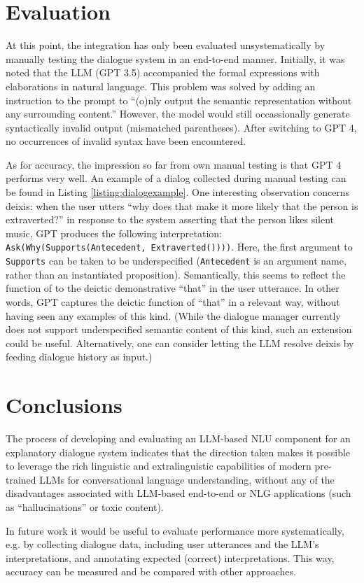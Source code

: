 \documentclass[11pt]{article}
\begin{document}
\section{Evaluation}
\label{sec:evaluation}
At this point, the integration has only been evaluated unsystematically by manually testing the dialogue system in an end-to-end manner. Initially, it was noted that the LLM (GPT 3.5) accompanied the formal expressions with elaborations in natural language. This problem was solved by adding an instruction to the prompt to ``(o)nly output the semantic representation without any surrounding content.'' However, the model would still occassionally generate syntactically invalid output (mismatched parentheses). After switching to GPT 4, no occurrences of invalid syntax have been encountered.

As for accuracy, the impression so far from own manual testing is that GPT 4 performs very well. An example of a dialog collected during manual testing can be found in Listing \ref{listing:dialogexample}. One interesting observation concerns deixis: when the user utters ``why does that make it more likely that the person is extraverted?'' in response to the system asserting that the person likes silent music, GPT produces the following interpretation: \texttt{Ask(Why(Supports(Antecedent, Extraverted())))}. Here, the first argument to \texttt{Supports} can be taken to be underspecified (\texttt{Antecedent} is an argument name, rather than an instantiated proposition). Semantically, this seems to reflect the function of to the deictic demonstrative ``that'' in the user utterance. In other words, GPT captures the deictic function of ``that'' in a relevant way, without having seen any examples of this kind. (While the dialogue manager currently does not support underspecified semantic content of this kind, such an extension could be useful. Alternatively, one can consider letting the LLM resolve deixis by feeding dialogue history as input.)



\section{Conclusions}
The process of developing and evaluating an LLM-based NLU component for an explanatory dialogue system indicates that the direction taken makes it possible to leverage the rich linguistic and extralinguistic capabilities of modern pre-trained LLMs for conversational language understanding, without any of the disadvantages associated with LLM-based end-to-end or NLG applications (such as ``hallucinations'' or toxic content).

In future work it would be useful to evaluate performance more systematically, e.g. by collecting dialogue data, including user utterances and the LLM's interpretations, and annotating expected (correct) interpretations. This way, accuracy can be measured and be compared with other approaches.
\end{document}
